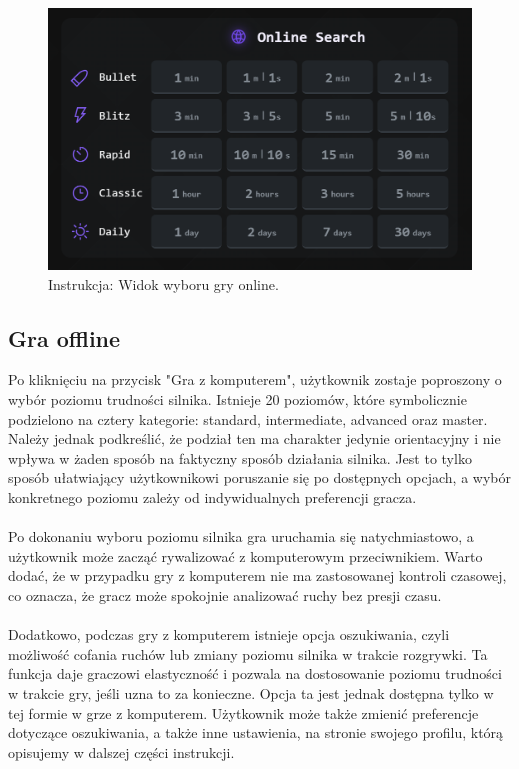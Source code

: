 \documentclass[12pt,a4paper]{article}
\begin{document}
\vspace{0.5cm}
\begin{figure}[h!]
    \centering
    \includegraphics[width=1\textwidth]{images/ins_min_pvp.png}
    \caption{Instrukcja: Widok wyboru gry online.}
\end{figure}

\newpage

\subsection{Gra offline}
Po kliknięciu na przycisk "Gra z komputerem", użytkownik zostaje poproszony o wybór poziomu trudności silnika. Istnieje 20 poziomów, które symbolicznie podzielono na cztery kategorie: standard, intermediate, advanced oraz master. Należy jednak podkreślić, że podział ten ma charakter jedynie orientacyjny i nie wpływa w żaden sposób na faktyczny sposób działania silnika. Jest to tylko sposób ułatwiający użytkownikowi poruszanie się po dostępnych opcjach, a wybór konkretnego poziomu zależy od indywidualnych preferencji gracza.
\\\\
Po dokonaniu wyboru poziomu silnika gra uruchamia się natychmiastowo, a użytkownik może zacząć rywalizować z komputerowym przeciwnikiem. Warto dodać, że w przypadku gry z komputerem nie ma zastosowanej kontroli czasowej, co oznacza, że gracz może spokojnie analizować ruchy bez presji czasu.
\\\\
Dodatkowo, podczas gry z komputerem istnieje opcja oszukiwania, czyli możliwość cofania ruchów lub zmiany poziomu silnika w trakcie rozgrywki. Ta funkcja daje graczowi elastyczność i pozwala na dostosowanie poziomu trudności w trakcie gry, jeśli uzna to za konieczne. Opcja ta jest jednak dostępna tylko w tej formie w grze z komputerem. Użytkownik może także zmienić preferencje dotyczące oszukiwania, a także inne ustawienia, na stronie swojego profilu, którą opisujemy w dalszej części instrukcji.
\end{document}
